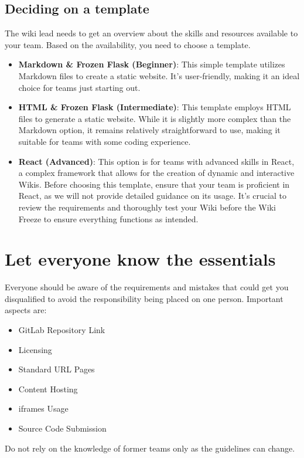     \subsection{Deciding on a template } \label{subsec:template-decision}
    The wiki lead needs to get an overview about the skills and resources available to your team.
    Based on the availability, you need to choose a template.

    \begin{itemize}
        \item \textbf{Markdown \& Frozen Flask (Beginner)}: This simple template utilizes Markdown files to create a static website. 
        It's user-friendly, making it an ideal choice for teams just starting out.
        \item \textbf{HTML \& Frozen Flask (Intermediate)}: This template employs HTML files to generate a static website. 
        While it is slightly more complex than the Markdown option, it remains relatively straightforward to use, making it suitable for teams with some coding experience.
        \item \textbf{React (Advanced)}: This option is for teams with advanced skills in React, a complex framework that allows for the creation of dynamic and interactive Wikis. 
        Before choosing this template, ensure that your team is proficient in React, as we will not provide detailed guidance on its usage.
        It’s crucial to review the requirements and thoroughly test your Wiki before the Wiki Freeze to ensure everything functions as intended.
    \end{itemize}



    \section{Let everyone know the essentials } \label{sec:the-essentials}
    Everyone should be aware of the requirements and mistakes that could get you disqualified to avoid the responsibility being placed on one person.
    Important aspects are: %
    \begin{itemize}
        \item GitLab Repository Link
        \item Licensing 
        \item Standard URL Pages 
        \item Content Hosting
        \item iframes Usage %
        \item Source Code Submission
    \end{itemize}
    Do not rely on the knowledge of former teams only as the guidelines can change.
    
